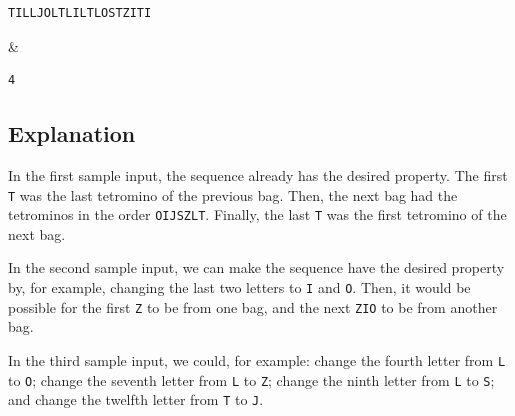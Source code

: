 \begin{sampleIO}
\begin{verbatim}
TILLJOLTLILTLOSTZITI
\end{verbatim}
&
\begin{verbatim}
4
\end{verbatim}
\end{sampleIO}


\subsection*{Explanation}
In the first sample input, the sequence already has the desired property.  The first \texttt{T} was the last tetromino of the previous bag.  Then, the next bag had the tetrominos in the order \texttt{OIJSZLT}.  Finally, the last \texttt{T} was the first tetromino of the next bag.

In the second sample input, we can make the sequence have the desired property by, for example, changing the last two letters to \texttt{I} and \texttt{O}.  Then, it would be possible for the first \texttt{Z} to be from one bag, and the next \texttt{ZIO} to be from another bag.

In the third sample input, we could, for example:  change the fourth letter from \texttt{L} to \texttt{O}; change the seventh letter from \texttt{L} to \texttt{Z}; change the ninth letter from \texttt{L} to \texttt{S}; and change the twelfth letter from \texttt{T} to \texttt{J}.
